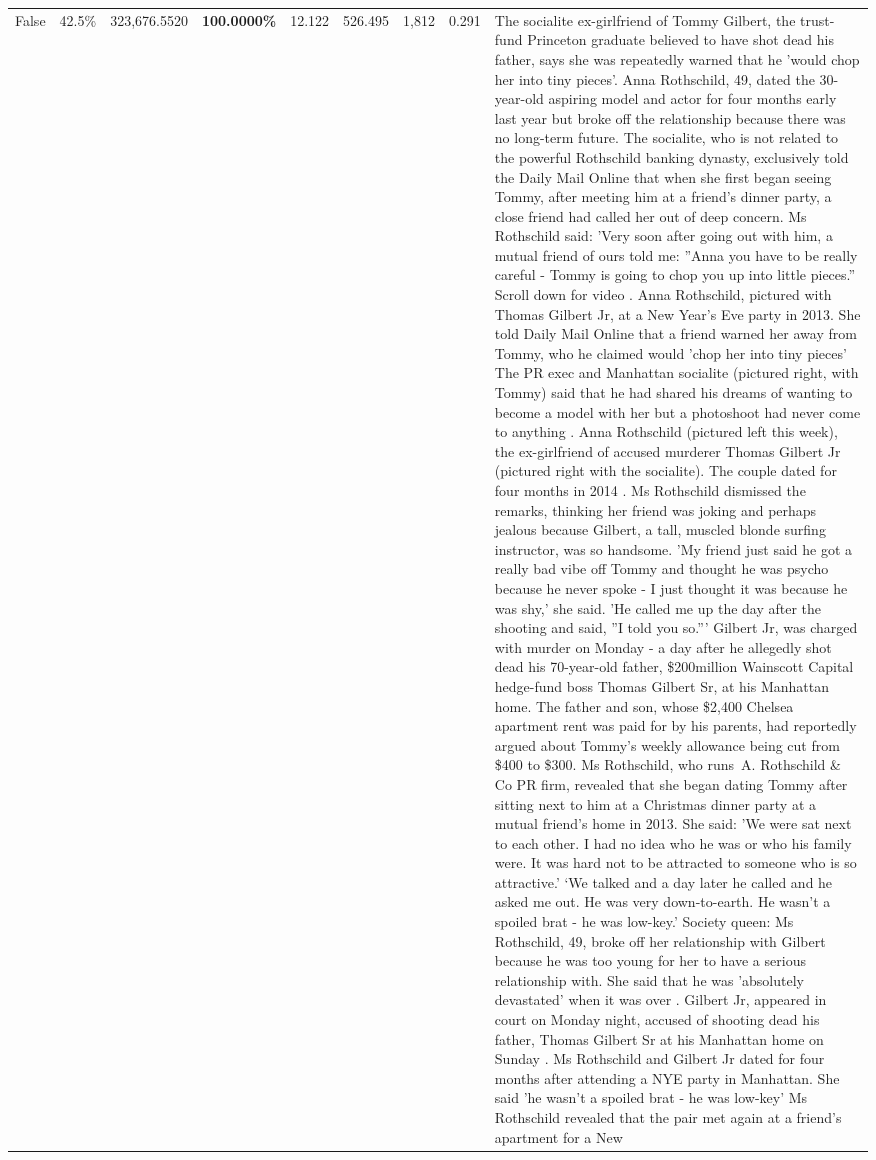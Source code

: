 \begin{table}[H]
\begin{tabular}{lllrlllll}
False & 42.5\% & 323,676.5520 & \bfseries \color{red} 100.0000\% & 12.122 & 526.495 & 1,812 & 0.291 & The socialite ex-girlfriend of Tommy Gilbert, the trust-fund Princeton graduate believed to have shot dead his father, says she was repeatedly warned that he 'would chop her into tiny pieces'. Anna Rothschild, 49, dated the 30-year-old aspiring model and actor for four months early last year but broke off the relationship because there was no long-term future. The socialite, who is not related to the powerful Rothschild banking dynasty, exclusively told the Daily Mail Online that when she first began seeing Tommy, after meeting him at a friend's dinner party, a close friend had called her out of deep concern. Ms Rothschild said: 'Very soon after going out with him, a mutual friend of ours told me: ''Anna you have to be really careful - Tommy is going to chop you up into little pieces.'' Scroll down for video . Anna Rothschild, pictured with Thomas Gilbert Jr, at a New Year's Eve party in 2013. She told Daily Mail Online that a friend warned her away from Tommy, who he claimed would 'chop her into tiny pieces' The PR exec and Manhattan socialite (pictured right, with Tommy) said that he had shared his dreams of wanting to become a model with her but a photoshoot had never come to anything . Anna Rothschild (pictured left this week), the ex-girlfriend of accused murderer Thomas Gilbert Jr (pictured right with the socialite). The couple dated for four months in 2014 . Ms Rothschild dismissed the remarks, thinking her friend was joking and perhaps jealous because Gilbert, a tall, muscled blonde surfing instructor, was so handsome. 'My friend just said he got a really bad vibe off Tommy and thought he was psycho because he never spoke - I just thought it was because he was shy,' she said. 'He called me up the day after the shooting and said, ''I told you so.''' Gilbert Jr, was charged with murder on Monday - a day after he allegedly shot dead his 70-year-old father, \$200million Wainscott Capital hedge-fund boss Thomas Gilbert Sr, at his Manhattan home. The father and son, whose \$2,400 Chelsea apartment rent was paid for by his parents, had reportedly argued about Tommy's weekly allowance being cut from \$400 to \$300. Ms Rothschild, who runs A. Rothschild \& Co PR firm, revealed that she began dating Tommy after sitting next to him at a Christmas dinner party at a mutual friend's home in 2013. She said: 'We were sat next to each other. I had no idea who he was or who his family were. It was hard not to be attracted to someone who is so attractive.' ‘We talked and a day later he called and he asked me out. He was very down-to-earth. He wasn’t a spoiled brat - he was low-key.’ Society queen: Ms Rothschild, 49, broke off her relationship with Gilbert because he was too young for her to have a serious relationship with. She said that he was 'absolutely devastated' when it was over . Gilbert Jr, appeared in court on Monday night, accused of shooting dead his father, Thomas Gilbert Sr at his Manhattan home on Sunday . Ms Rothschild and Gilbert Jr dated for four months after attending a NYE party in Manhattan. She said 'he wasn't a spoiled brat - he was low-key' Ms Rothschild revealed that the pair met again at a friend’s apartment for a New 
\end{tabular}
\end{table}
